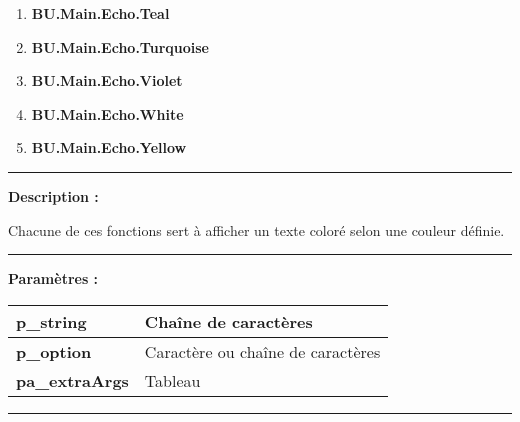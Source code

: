\documentclass[a4paper,10pt]{article}
\begin{document}
\begin{justify}
\begin{enumerate}
            \setlength{\parskip}{1em}

            \item \textbf{\color{Teal}BU.Main.Echo.Teal}\setlength{\parskip}{0em}
            \item \textbf{\color{Turquoise}BU.Main.Echo.Turquoise}
            \item \textbf{\color{Violet}BU.Main.Echo.Violet}

            \setlength{\parskip}{1em}

            \item \textbf{\color{text}BU.Main.Echo.White}\setlength{\parskip}{0em}
            \item \textbf{\color{Yellow}BU.Main.Echo.Yellow}
        \end{enumerate}
    \end{justify}


    \par\noindent\rule{\textwidth}{0.4pt}

    \begin{justify}
        \textbf{Description :}

        Chacune de ces fonctions sert à afficher un texte coloré selon une couleur définie.
    \end{justify}


    \par\noindent\rule{\textwidth}{0.4pt}

    \begin{justify}
        \textbf{Paramètres :}

        \begin{tabular}{|l|l|}
            \hline
            \textbf{\color{vars}p\_string} & Chaîne de caractères\\
            \hline
            \textbf{\color{vars}p\_option} & Caractère ou chaîne de caractères\\
            \hline
            \textbf{\color{vars}pa\_extraArgs} & Tableau\\
            \hline
        \end{tabular}
    \end{justify}


    \par\noindent\rule{\textwidth}{0.4pt}
\end{document}
